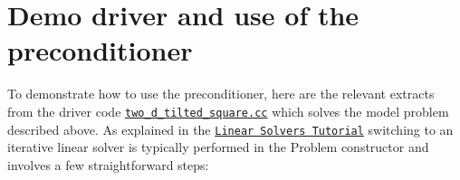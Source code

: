  

\hypertarget{index_example}{}\section{Demo driver and use of the preconditioner}\label{index_example}
To demonstrate how to use the preconditioner, here are the relevant extracts from the driver code \href{../../../../demo_drivers/navier_stokes/lagrange_enforced_flow_preconditioner/two_d_tilted_square.cc}{\tt two\+\_\+d\+\_\+tilted\+\_\+square.\+cc} which solves the model problem described above. As explained in the \href{../../../linear_solvers/html/index.html}{\tt Linear Solvers Tutorial} switching to an iterative linear solver is typically performed in the {\ttfamily Problem} constructor and involves a few straightforward steps\+:


